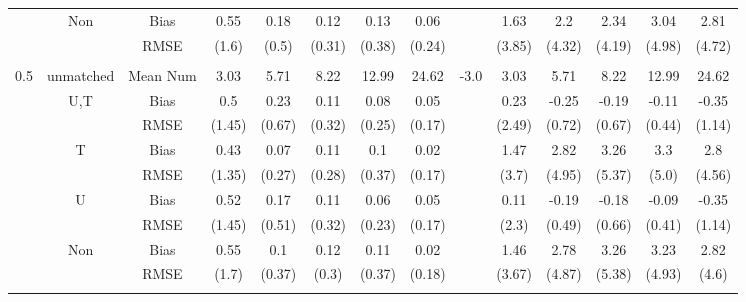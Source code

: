 \begin{tabular}{@{\extracolsep{5pt}}lc|cccccc|lccccc}
 & Non & Bias & 0.55 & 0.18 & 0.12 & 0.13 & 0.06 &  & 1.63 & 2.2 & 2.34 & 3.04 & 2.81 \\
 &  & RMSE & (1.6) & (0.5) & (0.31) & (0.38) & (0.24) &  & (3.85) & (4.32) & (4.19) & (4.98) & (4.72) \\
 &  &  &  &  &  &  &  &  &  &  &  &  &  \\
0.5 & unmatched & Mean Num & 3.03 & 5.71 & 8.22 & 12.99 & 24.62 & -3.0 & 3.03 & 5.71 & 8.22 & 12.99 & 24.62 \\
 & U,T & Bias & 0.5 & 0.23 & 0.11 & 0.08 & 0.05 &  & 0.23 & -0.25 & -0.19 & -0.11 & -0.35 \\
 &  & RMSE & (1.45) & (0.67) & (0.32) & (0.25) & (0.17) &  & (2.49) & (0.72) & (0.67) & (0.44) & (1.14) \\
 & T & Bias & 0.43 & 0.07 & 0.11 & 0.1 & 0.02 &  & 1.47 & 2.82 & 3.26 & 3.3 & 2.8 \\
 &  & RMSE & (1.35) & (0.27) & (0.28) & (0.37) & (0.17) &  & (3.7) & (4.95) & (5.37) & (5.0) & (4.56) \\
 & U & Bias & 0.52 & 0.17 & 0.11 & 0.06 & 0.05 &  & 0.11 & -0.19 & -0.18 & -0.09 & -0.35 \\
 &  & RMSE & (1.45) & (0.51) & (0.32) & (0.23) & (0.17) &  & (2.3) & (0.49) & (0.66) & (0.41) & (1.14) \\
 & Non & Bias & 0.55 & 0.1 & 0.12 & 0.11 & 0.02 &  & 1.46 & 2.78 & 3.26 & 3.23 & 2.82 \\
 &  & RMSE & (1.7) & (0.37) & (0.3) & (0.37) & (0.18) &  & (3.67) & (4.87) & (5.38) & (4.93) & (4.6) \\
 &  &  &  &  &  &  &  &  &  &  &  &  &  \\
\hline 
\bottomrule 
\end{tabular}
